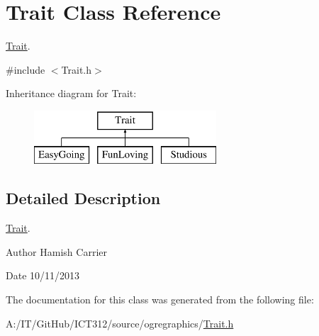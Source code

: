 \hypertarget{class_trait}{\section{Trait Class Reference}
\label{class_trait}
}


\hyperlink{class_trait}{Trait}.  




{\ttfamily \#include $<$Trait.\-h$>$}

Inheritance diagram for Trait\-:\begin{figure}[H]
\begin{center}
\leavevmode
\includegraphics[height=2.000000cm]{class_trait}
\end{center}
\end{figure}


\subsection{Detailed Description}
\hyperlink{class_trait}{Trait}. 

\begin{DoxyAuthor}{Author}
Hamish Carrier 
\end{DoxyAuthor}
\begin{DoxyDate}{Date}
10/11/2013 
\end{DoxyDate}


The documentation for this class was generated from the following file\-:\begin{DoxyCompactItemize}
\item 
A\-:/\-I\-T/\-Git\-Hub/\-I\-C\-T312/source/ogregraphics/\hyperlink{_trait_8h}{Trait.\-h}\end{DoxyCompactItemize}
